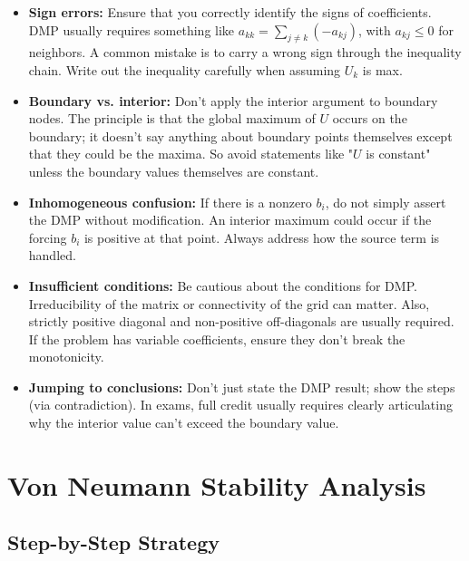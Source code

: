 \documentclass[a4paper,11pt]{article}
\begin{document}
\begin{itemize}
    \item \textbf{Sign errors:} Ensure that you correctly identify the signs of coefficients. DMP usually requires something like $a_{kk} = \sum_{j\ne k}(-a_{kj})$, with $a_{kj} \le 0$ for neighbors. A common mistake is to carry a wrong sign through the inequality chain. Write out the inequality carefully when assuming $U_k$ is max.

    \item \textbf{Boundary vs. interior:} Don't apply the interior argument to boundary nodes. The principle is that the global maximum of $U$ occurs on the boundary; it doesn't say anything about boundary points themselves except that they could be the maxima. So avoid statements like "$U$ is constant" unless the boundary values themselves are constant.

    \item \textbf{Inhomogeneous confusion:} If there is a nonzero $b_i$, do not simply assert the DMP without modification. An interior maximum could occur if the forcing $b_i$ is positive at that point. Always address how the source term is handled.

    \item \textbf{Insufficient conditions:} Be cautious about the conditions for DMP. Irreducibility of the matrix or connectivity of the grid can matter. Also, strictly positive diagonal and non-positive off-diagonals are usually required. If the problem has variable coefficients, ensure they don't break the monotonicity.

    \item \textbf{Jumping to conclusions:} Don't just state the DMP result; show the steps (via contradiction). In exams, full credit usually requires clearly articulating why the interior value can't exceed the boundary value.
\end{itemize}

\section{Von Neumann Stability Analysis}

\subsection{Step-by-Step Strategy}
\end{document}
